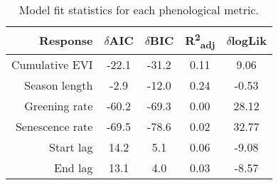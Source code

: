 \begin{table}[ht]
\centering
\begin{tabular}{rcccc}
  \hline
Response & $\delta$AIC & $\delta$BIC & R\textsuperscript{2}\textsubscript{adj} & $\delta$logLik \\ 
  \hline
Cumulative EVI & -22.1 & -31.2 & 0.11 & 9.06 \\ 
  Season length & -2.9 & -12.0 & 0.24 & -0.53 \\ 
  Greening rate & -60.2 & -69.3 & 0.00 & 28.12 \\ 
  Senescence rate & -69.5 & -78.6 & 0.02 & 32.77 \\ 
  Start lag & 14.2 & 5.1 & 0.06 & -9.08 \\ 
  End lag & 13.1 & 4.0 & 0.03 & -8.57 \\ 
   \hline
\end{tabular}
\caption{Model fit statistics for each phenological metric.} 
\label{mod_stat}
\end{table}

